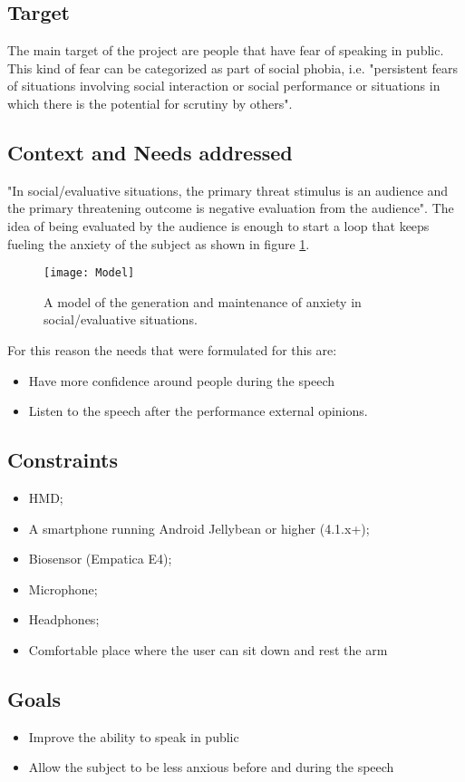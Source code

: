 \subsection{Target}
The main target of the project are people that have fear of speaking in public. This kind of fear can be categorized as part of social phobia, i.e. "persistent fears of situations involving social interaction or social performance or situations in which there is the potential for scrutiny by others"\cite{model}.

\subsection{Context and Needs addressed}
"In social/evaluative situations, the primary threat stimulus is an audience and the primary threatening outcome is negative evaluation from the audience"\cite{model}.
The idea of being evaluated by the audience is enough to start a loop that keeps fueling the anxiety of the subject as shown in figure \ref{fig:model}.
\begin{figure}[!h]
	\centering
	\texttt{[image: Model]}
	\caption{A model of the generation and maintenance of anxiety in social/evaluative situations\cite{model}.}\label{fig:model}
\end{figure}

For this reason the needs that were formulated for this are:
\begin{itemize}
	\item Have more confidence around people during the speech
	\item Listen to the speech after the performance
 external opinions.
\end{itemize}

\subsection{Constraints}
\begin{itemize}
	\item HMD;
	\item A smartphone running Android Jellybean or higher (4.1.x+);
	\item Biosensor (Empatica E4);
	\item Microphone;
	\item Headphones;
	\item Comfortable place where the user can sit down and rest the arm
\end{itemize}

\subsection{Goals}
\begin{itemize}
	\item Improve the ability to speak in public
	\item Allow the subject to be less anxious before and during the speech
\end{itemize}



